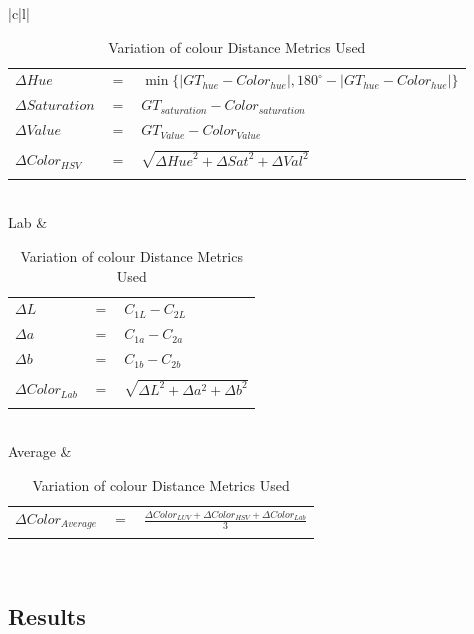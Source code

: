 \begin{table}[!ht]
\begin{tabular}{|c|l|}
\begin{tabular}{lcl}
$\Delta{Hue}$ & $=$ & $\min\{ \mid GT_{hue} - Color_{hue} \mid,  180^{\circ} - \mid GT_{hue} - Color_{hue} \mid  \}$ \\
$\Delta  Saturation$ & $=$ & $GT_{saturation} - Color_{saturation}$ \\
$\Delta  Value$ &  $=$ & $GT_{Value} - Color_{Value}$ \\
\\
$\Delta Color_{HSV}$ & $=$ & $\sqrt{\Delta{Hue}^{2} + \Delta{Sat}^{2}  + \Delta{Val}^{2} }$
\\
\hspace{4em}& & \\
\end{tabular}\\
\hline
Lab & 
\begin{tabular}{lcl}
\\
$\Delta L$ & $=$ & $C_{1L} - C_{2L}$\\
$\Delta a$ & $=$ & $C_{1a} - C_{2a}$\\
$\Delta b$ & $=$ & $C_{1b} - C_{2b}$\\
\\
$\Delta{Color_{Lab}}$ & $=$ & $\sqrt{\Delta{L}^{2} + \Delta{a}^{2}  + \Delta{b}^{2} }$
\\
\hspace{5em}& & \\
\end{tabular}\\
\hline
Average &
\begin{tabular}{lcl}
\\
$\Delta{Color_{Average}}$ & $=$ & $\frac{\Delta{Color_{LUV}} + \Delta{Color_{HSV}} + \Delta{Color_{Lab}}}{3}$
\\
\hspace{4em}& & \\
\end{tabular}\\
\hline
\end{tabular}
\caption{Variation of colour Distance Metrics Used}
\label{table:ColorVariation}
\end{table}


\subsection{Results}

